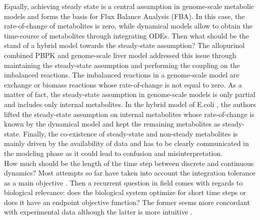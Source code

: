 Equally, achieving steady state is a central assumption in genome-scale metabolic models and forms the basis for Flux Balance Analysis (FBA). In this case, the rate-of-change of metabolites is zero, while dynamical models allow to obtain the time-course of metabolites through integrating ODEs. Then what should be the stand of a hybrid model towards the steady-state assumption? The allopurinol combined PBPK and genome-scale liver model \cite{krauss2012integrating} addressed this issue through maintaining the steady-state assumption and performing the coupling on the imbalanced reactions. The imbalanced reactions in a genome-scale model are exchange or biomass reactions whose rate-of-change is not equal to zero. As a matter of fact, the steady-state assumption in genome-scale models is only partial and includes only internal metabolites. In the hybrid model of E.coli \cite{covert2008integrating}, the authors lifted the steady-state assumption on internal metabolites whose rate-of-change is known by the dynamical model and kept the remaining metabolites as steady-state. Finally, the co-existence of steady-state and non-steady metabolites is mainly driven by the availability of data and has to be clearly communicated in the modeling phase as it could lead to confusion and misinterpretation.\\
How much should be the length of the time step between discrete and continuous dynamics? Most attempts so far have taken into account the integration tolerance as a main objective \cite{covert2008integrating,gomez2014dfbalab,hanly2011dynamic}. Then a recurrent question in field comes with regards to biological relevance: does the biological system optimize for short time steps or does it have an endpoint objective function? The former seems more concordant with experimental data although the latter is more intuitive \cite{mahadevan2002dynamic}.
